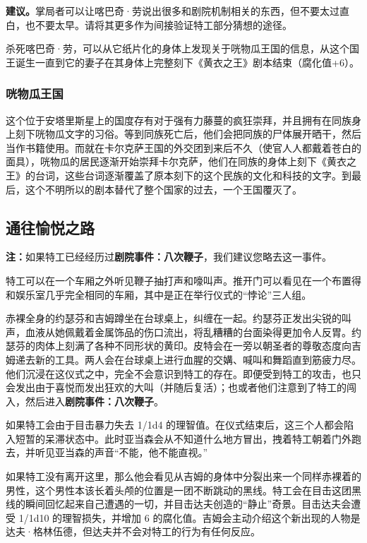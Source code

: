 \textbf{建议。}掌局者可以让喀巴奇·劳说出很多和剧院机制相关的东西，但不要太过直白，也不要太早。请将其更多作为间接验证特工部分猜想的途径。

杀死喀巴奇·劳，可以从它纸片化的身体上发现关于咣物瓜王国的信息，从这个国王诞生一直到它的妻子在其身体上完整刻下《黄衣之王》剧本结束（腐化值+6）。

\subsubsection{咣物瓜王国}
这个位于安塔里斯星上的国度存有对于强有力藤蔓的疯狂崇拜，并且拥有在同族身上刻下咣物瓜文字的习俗。等到同族死亡后，他们会把同族的尸体展开晒干，然后当作书籍使用。而就在卡尔克萨王国的外交团到来后不久（使官人人都戴着苍白的面具），咣物瓜的居民逐渐开始崇拜卡尔克萨，他们在同族的身体上刻下《黄衣之王》的台词，这些台词逐渐覆盖了原本刻下的这个民族的文化和科技的文字。到最后，这个不明所以的剧本替代了整个国家的过去，一个王国覆灭了。

\subsection{通往愉悦之路}

\textbf{注：}如果特工已经经历过\textbf{剧院事件：八次鞭子}，我们建议您略去这一事件。

特工可以在一个车厢之外听见鞭子抽打声和嚎叫声。推开门可以看见在一个布置得和娱乐室几乎完全相同的车厢，其中是正在举行仪式的“悖论”三人组。

赤裸全身的约瑟芬和吉姆蹲坐在台球桌上，纠缠在一起。约瑟芬正发出尖锐的叫声，血液从她佩戴着金属饰品的伤口流出，将乱糟糟的台面染得更加令人反胃。约瑟芬的肉体上刻满了各种不同形状的黄印。皮特会在一旁以朝圣者的尊敬态度向吉姆递去新的工具。两人会在台球桌上进行血腥的交媾、喊叫和舞蹈直到筋疲力尽。他们沉浸在这仪式之中，完全不会意识到特工的存在。即便受到特工的攻击，也只会发出由于喜悦而发出狂欢的大叫（并随后复活）；也或者他们注意到了特工的闯入，然后进入\textbf{剧院事件：八次鞭子}。

如果特工会由于目击暴力失去 1/1d4 的理智值。在仪式结束后，这三个人都会陷入短暂的呆滞状态中。此时亚当森会从不知道什么地方冒出，拽着特工朝着门外跑去，并听见亚当森的声音“不能，他不能直视。”

如果特工没有离开这里，那么他会看见从吉姆的身体中分裂出来一个同样赤裸着的男性，这个男性本该长着头颅的位置是一团不断跳动的黑线。特工会在目击这团黑线的瞬间回忆起来自己遭遇的一切，并目击达夫创造的“静止”奇景。目击达夫会遭受 1/1d10 的理智损失，并增加 6 的腐化值。吉姆会主动介绍这个新出现的人物是达夫·格林伍德，但达夫并不会对特工的行为有任何反应。

